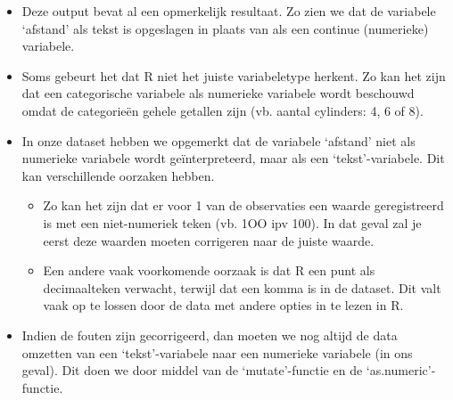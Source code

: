 \documentclass[]{tufte-book}
\newenvironment{Shaded}{}{}
\newcommand{\DataTypeTok}[1]{\textcolor[rgb]{0.56,0.13,0.00}{#1}}
\newcommand{\KeywordTok}[1]{\textcolor[rgb]{0.00,0.44,0.13}{\textbf{#1}}}
\newcommand{\NormalTok}[1]{#1}
\newcommand{\OperatorTok}[1]{\textcolor[rgb]{0.40,0.40,0.40}{#1}}
\newcommand{\StringTok}[1]{\textcolor[rgb]{0.25,0.44,0.63}{#1}}
\providecommand{\tightlist}{%
  \setlength{\itemsep}{0pt}\setlength{\parskip}{0pt}}
\begin{document}
\begin{itemize}
\tightlist
\item
  Deze output bevat al een opmerkelijk resultaat. Zo zien we dat de variabele `afstand' als tekst is opgeslagen in plaats van als een continue (numerieke) variabele.
\item
  Soms gebeurt het dat R niet het juiste variabeletype herkent. Zo kan het zijn dat een categorische variabele als numerieke variabele wordt beschouwd omdat de categorieën gehele getallen zijn (vb. aantal cylinders: 4, 6 of 8).
\item
  In onze dataset hebben we opgemerkt dat de variabele `afstand' niet als numerieke variabele wordt geïnterpreteerd, maar als een `tekst'-variabele. Dit kan verschillende oorzaken hebben.

  \begin{itemize}
  \tightlist
  \item
    Zo kan het zijn dat er voor 1 van de observaties een waarde geregistreerd is met een niet-numeriek teken (vb. 1OO ipv 100). In dat geval zal je eerst deze waarden moeten corrigeren naar de juiste waarde.
  \item
    Een andere vaak voorkomende oorzaak is dat R een punt als decimaalteken verwacht, terwijl dat een komma is in de dataset. Dit valt vaak op te lossen door de data met andere opties in te lezen in R.
  \end{itemize}
\item
  Indien de fouten zijn gecorrigeerd, dan moeten we nog altijd de data omzetten van een `tekst'-variabele naar een numerieke variabele (in ons geval). Dit doen we door middel van de `mutate'-functie en de `as.numeric'-functie.
\end{itemize}

\begin{Shaded}
\end{Shaded}
\end{document}
